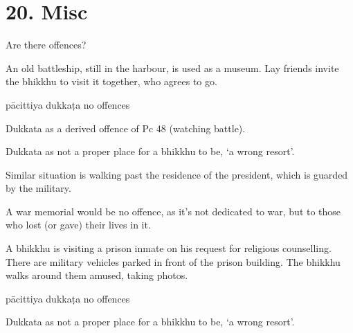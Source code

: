 \chapter{20. Misc}
\renewcommand*{\theChapterTitle}{20. Misc}

\begin{exam}{\autoExamName}

  \begin{problem*}

    Are there offences?

    \begin{parts}

      \item An old battleship, still in the harbour, is used as a museum. Lay
      friends invite the bhikkhu to visit it together, who agrees to go.

      \bigskip

      \begin{answers}{3}
        \bChoices
         pācittiya\eAns
         dukkaṭa\eAns
         no offences\eAns
        \eChoices
      \end{answers}

      \begin{solution}
        Dukkata as a derived offence of Pc 48 (watching battle).

        Dukkata as not a proper place for a bhikkhu to be, `a wrong resort'.

        Similar situation is walking past the residence of the president, which is guarded by the military.

        A war memorial would be no offence, as it's not dedicated to war, but to those who lost (or gave) their lives in it.
      \end{solution}

      \bigskip

      \item A bhikkhu is visiting a prison inmate on his request for religious
      counselling. There are military vehicles parked in front of the prison
      building. The bhikkhu walks around them amused, taking photos.

      \bigskip

      \begin{answers}{3}
        \bChoices
         pācittiya\eAns
         dukkaṭa\eAns
         no offences\eAns
        \eChoices
      \end{answers}

      \begin{solution}
        Dukkata as not a proper place for a bhikkhu to be, `a wrong resort'.
      \end{solution}


\end{parts}
\end{problem*}
\end{exam}
